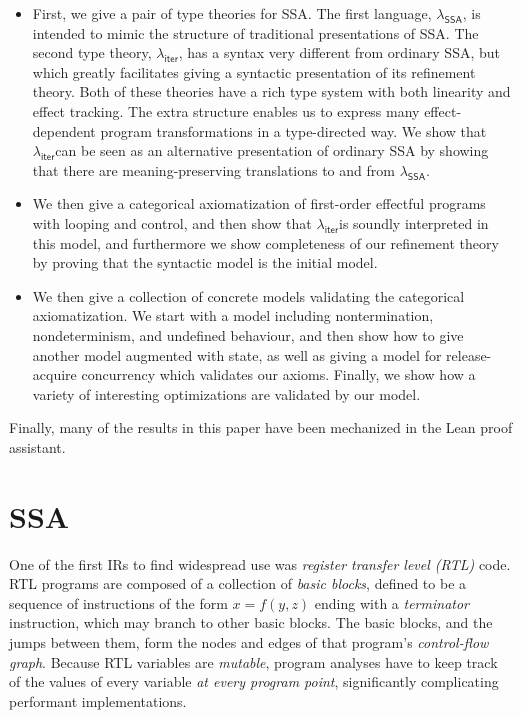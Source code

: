 \documentclass[acmsmall,screen,anonymous,review]{acmart}
\newcommand{\ms}[1]{\ensuremath{\mathsf{#1}}}
\newcommand{\subiterexp}{\texorpdfstring{\(\lambda_{\ms{iter}}\)}{lambda-iter}}
\newcommand{\isotopessa}{\(\lambda_{\ms{SSA}}\)}
\begin{document}
\begin{itemize}
\item First, we give a pair of type theories for SSA. The first
  language, \isotopessa, is intended to mimic the structure of
  traditional presentations of SSA. The second type theory,
  \subiterexp, has a syntax very different from ordinary SSA, but
  which greatly facilitates giving a syntactic presentation of its
  refinement theory. Both of these theories have a rich type system
  with both linearity and effect tracking. The extra structure enables
  us to express many effect-dependent program transformations in a
  type-directed way. We show that \subiterexp can be seen as an
  alternative presentation of ordinary SSA by showing that there are
  meaning-preserving translations to and from \isotopessa.
\item We then give a categorical axiomatization of first-order
  effectful programs with looping and control, and then show that
  \subiterexp is soundly interpreted in this model, and furthermore we
  show completeness of our refinement theory by proving that the
  syntactic model is the initial model.
\item We then give a collection of concrete models validating the
  categorical axiomatization. We start with a model including
  nontermination, nondeterminism, and undefined behaviour, and then
  show how to give another model augmented with state, as well as
  giving a model for release-acquire concurrency which validates our
  axioms. Finally, we show how a variety of interesting optimizations
  are validated by our model.
\end{itemize}
Finally, many of the results in this paper have been mechanized in the Lean proof assistant. 
\section{SSA}

\label{sec:ssa-intro}

One of the first IRs to find widespread use was \emph{register transfer level (RTL)} code. RTL
programs are composed of a collection of \emph{basic blocks}, defined to be a sequence of
instructions of the form $x = f(y, z)$ ending with a \emph{terminator} instruction, which may branch
to other basic blocks. The basic blocks, and the jumps between them, form the nodes and edges of
that program's \emph{control-flow graph}. Because RTL variables are \emph{mutable}, program analyses
have to keep track of the values of every variable \emph{at every program point}, significantly
complicating performant implementations.
\end{document}
